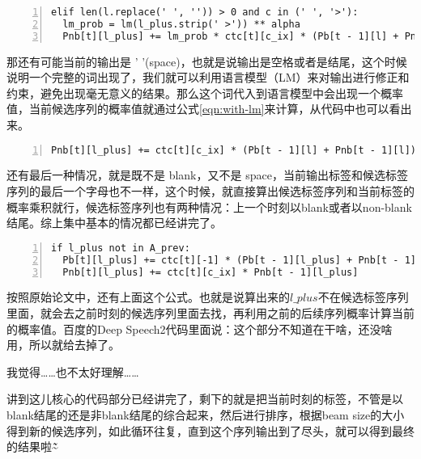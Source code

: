 {{\begin{lstlisting}[language = shell, numbers=left, 
         numberstyle=\tiny,keywordstyle=\color{blue!70},
         commentstyle=\color{red!50!green!50!blue!50},frame=shadowbox,
         rulesepcolor=\color{red!20!green!20!blue!20},basicstyle=\ttfamily]
elif len(l.replace(' ', '')) > 0 and c in (' ', '>'):
  lm_prob = lm(l_plus.strip(' >')) ** alpha
  Pnb[t][l_plus] += lm_prob * ctc[t][c_ix] * (Pb[t - 1][l] + Pnb[t - 1][l])
\end{lstlisting}

那还有可能当前的输出是 ' '(space)，也就是说输出是空格或者是结尾，这个时候说明一个完整的词出现了，我们就可以利用语言模型（LM）来对输出进行修正和约束，避免出现毫无意义的结果。那么这个词代入到语言模型中会出现一个概率值，当前候选序列的概率值就通过公式\ref{eqn:with-lm}来计算，从代码中也可以看出来。

\begin{lstlisting}[language = shell, numbers=left, 
         numberstyle=\tiny,keywordstyle=\color{blue!70},
         commentstyle=\color{red!50!green!50!blue!50},frame=shadowbox,
         rulesepcolor=\color{red!20!green!20!blue!20},basicstyle=\ttfamily]
Pnb[t][l_plus] += ctc[t][c_ix] * (Pb[t - 1][l] + Pnb[t - 1][l])
\end{lstlisting}

还有最后一种情况，就是既不是 blank，又不是 space，当前输出标签和候选标签序列的最后一个字母也不一样，这个时候，就直接算出候选标签序列和当前标签的概率乘积就行，候选标签序列也有两种情况：上一个时刻以blank或者以non-blank结尾。综上集中基本的情况都已经讲完了。

\begin{lstlisting}[language = shell, numbers=left, 
         numberstyle=\tiny,keywordstyle=\color{blue!70},
         commentstyle=\color{red!50!green!50!blue!50},frame=shadowbox,
         rulesepcolor=\color{red!20!green!20!blue!20},basicstyle=\ttfamily]
if l_plus not in A_prev:
  Pb[t][l_plus] += ctc[t][-1] * (Pb[t - 1][l_plus] + Pnb[t - 1][l_plus])
  Pnb[t][l_plus] += ctc[t][c_ix] * Pnb[t - 1][l_plus]
\end{lstlisting}

按照原始论文中，还有上面这个公式。也就是说算出来的$l\_plus$不在候选标签序列里面，就会去之前时刻的候选序列里面去找，再利用之前的后续序列概率计算当前的概率值。百度的Deep Speech2代码里面说：这个部分不知道在干啥，还没啥用，所以就给去掉了。

我觉得……也不太好理解……

讲到这儿核心的代码部分已经讲完了，剩下的就是把当前时刻的标签，不管是以blank结尾的还是非blank结尾的综合起来，然后进行排序，根据beam size的大小得到新的候选序列，如此循环往复，直到这个序列输出到了尽头，就可以得到最终的结果啦\~\~\~

}}
